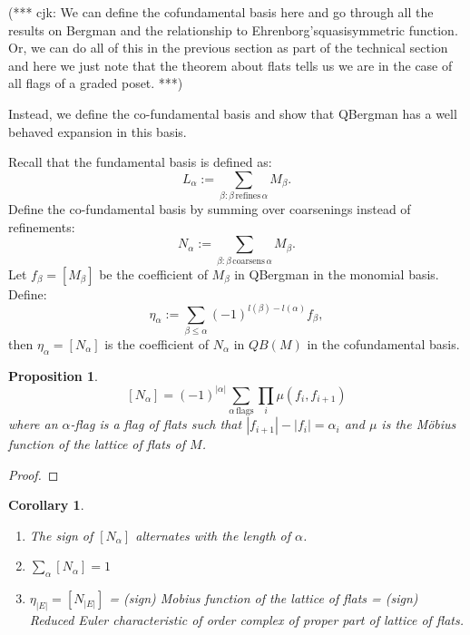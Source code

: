 \documentclass[12pt,reqno]{amsart}
\numberwithin{definition}{section}
\newtheorem{proposition}[definition]{Proposition}
\newtheorem{corollary}[definition]{Corollary}
\begin{document}
(*** cjk: We can define the cofundamental basis here and go through all the results on Bergman and the relationship to Ehrenborg'squasisymmetric function.  Or, we can do all of this in the previous section as part of the technical section and here we just note that the theorem about flats tells us we are in the case of all flags of a graded poset. ***) 

 Instead, we define the co-fundamental basis and show that QBergman
 has a well behaved expansion in this basis.

 


Recall that the fundamental basis is defined as:
$$ L_{\alpha} := \sum_{\beta : \beta \, \textrm{refines} \, \alpha} M_{\beta}.$$
Define the co-fundamental basis by summing over coarsenings instead of refinements:
$$ N_{\alpha} := \sum_{\beta : \beta \, \textrm{coarsens} \, \alpha} M_{\beta}.$$
Let $f_{\beta} = [M_{\beta}]$ be the coefficient of $M_{\beta}$ in
QBergman in the monomial basis.  Define: 
$$\eta_{\alpha} := \sum_{\beta \leq \alpha} (-1)^{l(\beta)-l(\alpha)}f_{\beta},$$
then $\eta_{\alpha} = [N_{\alpha}]$ is the coefficient of $N_{\alpha}$ in $QB(M)$ in the cofundamental basis.


\begin{proposition}
$$[N_{\alpha}] = (-1)^{|\alpha|} \sum_{\alpha \, \textrm{flags}} \prod_i \mu(f_i,f_{i+1})$$
where an $\alpha$-flag is a flag of flats such that $|f_{i+1}| - |f_i| = \alpha_i$ and $\mu$ is the M\"{o}bius function of the lattice of flats of $M$.
\end{proposition}

\begin{proof}
\end{proof}

\begin{corollary}
\begin{enumerate}
\item The sign of $[N_{\alpha}]$ alternates with the length of $\alpha$.  
\item $\sum_{\alpha} [N_{\alpha}] = 1$ 
\item $\eta_{|E|} = [N_{|E|}]$ = (sign) Mobius function of the lattice
of flats = (sign) Reduced Euler characteristic of order complex of
proper part of lattice of flats.
\end{enumerate}
\end{corollary}
\end{document}
